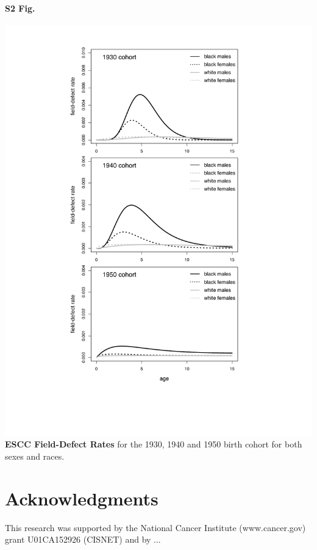 \documentclass[10pt,letterpaper]{article}
\begin{document}
\paragraph*{\Large{S2 Fig.}}
\label{S2_Fig}
\includegraphics[scale=.85, trim=40 80 0 0]{S2 Fig.pdf}
{\bf ESCC Field-Defect Rates} for the 1930, 1940 and 1950 birth cohort for both sexes and races. 

\section*{Acknowledgments}
This research was supported by the National Cancer Institute (www.cancer.gov) grant U01CA152926 (CISNET) and by ...

\nolinenumbers

%
%
% 


\end{document}

